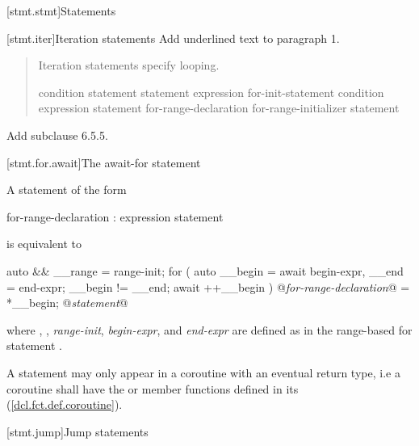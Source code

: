 
[stmt.stmt]{Statements}%

\setcounter{section}{4}
[stmt.iter]{Iteration statements}%
Add underlined text to paragraph 1.

\begin{quote}
\pnum
Iteration statements specify looping.

%
%
%
%
\begin{bnf}
	\br
	 condition \terminal{)} statement\br
	 statement  expression \terminal{) ;}\br
	 for-init-statement condition\opt \terminal{;} expression\opt \terminal{)} statement\br
	 for-range-declaration \terminal{:} for-range-initializer \terminal{)} statement\br
\end{bnf}
\end{quote}

Add subclause 6.5.5.

\setcounter{subsection}{4}
[stmt.for.await]{The await-for statement}%

\pnum
A  statement of the form

\begin{ncbnf}
	 for-range-declaration : expression \terminal{)} statement
\end{ncbnf}

is equivalent to

\begin{codeblock}
	{
		auto && __range = range-init;
		for ( auto __begin = await begin-expr,
		__end = end-expr;
		__begin != __end;
		await ++__begin ) {
			@\textit{for-range-declaration}@ = *__begin;
			@\textit{statement}@
		}
	}
\end{codeblock}

where , , 
\textit{range-init}, \textit{begin-expr}, and \textit{end-expr} are defined as in the range-based for statement .

\pnum
A  statement may only appear in a coroutine 
with an eventual return type, i.e a coroutine shall have the  or  member
functions defined in its  (\ref{dcl.fct.def.coroutine}).

\setcounter{section}{5}
[stmt.jump]{Jump statements}%

